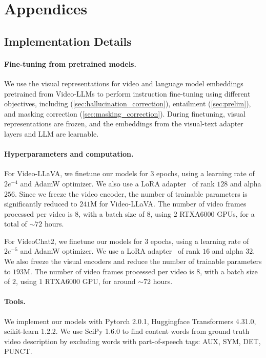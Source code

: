 \section{Appendices}
\label{sec:appendix}

\subsection{Implementation Details}
\label{app:implementation}

\paragraph{Fine-tuning from pretrained models.}
We use the visual representations for video and language model embeddings pretrained from Video-LLMs to perform instruction fine-tuning using different objectives, including \method{} (\autoref{sec:hallucination_correction}), entailment (\autoref{sec:prelim}), and masking correction (\autoref{sec:masking_correction}).
During finetuning, visual representations are frozen, and the embeddings from the visual-text adapter layers and LLM are learnable.


\paragraph{Hyperparameters and computation.}

For Video-LLaVA, we finetune our models for $3$ epochs, using a learning rate of $2e^{-4}$ and AdamW optimizer. We also use a LoRA adapter~\cite{hu2022lora} of rank $128$ and alpha $256$. Since we freeze the video encoder, the number of trainable parameters is significantly reduced to $241$M for Video-LLaVA. The number of video frames processed per video is $8$, with a batch size of $8$, using $2$ RTXA6000 GPUs, for a total of $\sim 72$ hours.

For VideoChat2, we finetune our models for $3$ epochs, using a learning rate of $2e^{-5}$ and AdamW optimizer. We use a LoRA adapter~\cite{hu2022lora} of rank $16$ and alpha $32$. We also freeze the visual encoders and reduce the number of trainable parameters to $193$M.  The number of video frames processed per video is $8$, with a batch size of $2$, using $1$ RTXA6000 GPU, for around $\sim 72$ hours.

\paragraph{Tools.}
We implement our models with Pytorch 2.0.1, Huggingface Transformers 4.31.0, scikit-learn 1.2.2. We use SciPy 1.6.0 to find content words from ground truth video description by excluding words with part-of-speech tags: AUX, SYM, DET, PUNCT.




